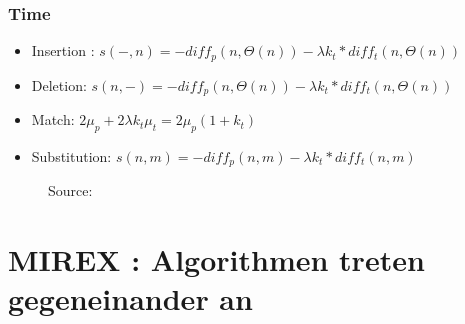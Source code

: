 \documentclass{beamer}
\begin{document}
	\begin{frame}
        \frametitle{Time}
            \begin{itemize}
             \item Insertion : $ s(-, n) = -diff_p(n,\Theta (n)) - \lambda k_t * diff_t(n,\Theta (n))$
            
             \item Deletion: $s(n, -) = -diff_p(n,\Theta (n)) - \lambda k_t * diff_t(n,\Theta (n))$
             \item Match: $2\mu_p + 2\lambda k_t\mu_t = 2\mu_p(1+k_t)$
             \item Substitution: $s(n,m) = -diff_p(n,m) - \lambda k_t * diff_t(n,m)$
            \end{itemize}
            \begin{center}
            \begin{figure}[h!]
             \caption{Source: \cite{five_point_two}}
            \end{figure}
            \end{center}
	\end{frame}
	

	\section{MIREX : Algorithmen treten gegeneinander an}
\end{document}
